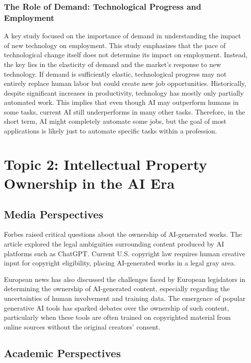 \documentclass[11pt]{article}
\begin{document}
\subsubsection{The Role of Demand: Technological Progress and Employment}

A key study focused on the importance of demand in understanding the impact of new technology on employment. This study emphasizes that the pace of technological change itself does not determine its impact on employment. Instead, the key lies in the elasticity of demand and the market's response to new technology. If demand is sufficiently elastic, technological progress may not entirely replace human labor but could create new job opportunities. Historically, despite significant increases in productivity, technology has mostly only partially automated work. This implies that even though AI may outperform humans in some tasks, current AI still underperforms in many other tasks. Therefore, in the short term, AI might completely automate some jobs, but the goal of most applications is likely just to automate specific tasks within a profession.\cite{bessen2018}

\section{Topic 2: Intellectual Property Ownership in the AI Era}

\subsection{Media Perspectives}

Forbes raised critical questions about the ownership of AI-generated works. The article explored the legal ambiguities surrounding content produced by AI platforms such as ChatGPT. Current U.S. copyright law requires human creative input for copyright eligibility, placing AI-generated works in a legal gray area.\cite{mckendrick2022}

European news has also discussed the challenges faced by European legislators in determining the ownership of AI-generated content, especially regarding the uncertainties of human involvement and training data. The emergence of popular generative AI tools has sparked debates over the ownership of such content, particularly when these tools are often trained on copyrighted material from online sources without the original creators' consent.\cite{euronews2023}

\subsection{Academic Perspectives}
\end{document}
